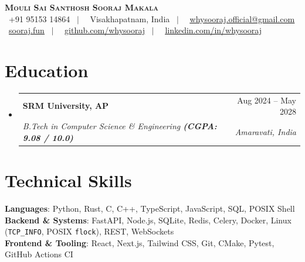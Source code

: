 \documentclass[letterpaper,11pt]{article}
\makeatletter
\newcommand{\resumeSubheading}[4]{
  \vspace{-2pt}\item
    \begin{tabular*}{0.97\textwidth}[t]{l@{\extracolsep{\fill}}r}
      \textbf{#1} & #2 \\
      \textit{\small#3} & \textit{\small #4} \\
    \end{tabular*}\vspace{-7pt}
}
\newcommand{\resumeSubHeadingListStart}{\begin{itemize}[leftmargin=0.15in, label={}]}
\newcommand{\resumeSubHeadingListEnd}{\end{itemize}}
\makeatother
\begin{document}
\begin{center}
    \textbf{\Huge \scshape Mouli Sai Santhosh Sooraj Makala} \\ \vspace{4pt}
    \small \faPhone* \ +91 95153 14864 \ $|$ \
    \faMapMarker* \ Visakhapatnam, India \ $|$ \
    \faEnvelope \ \href{mailto:whysooraj.official@gmail.com}{\underline{whysooraj.official@gmail.com}} \\ \vspace{2pt}
    \faGlobe \ \href{https://sooraj.fun}{\underline{sooraj.fun}} \ $|$ \
    \faGithub \ \href{https://github.com/whysooraj}{\underline{github.com/whysooraj}} \ $|$ \
    \faLinkedin \ \href{https://linkedin.com/in/whysooraj}{\underline{linkedin.com/in/whysooraj}}
\end{center}

\section{Education}
  \resumeSubHeadingListStart
    \resumeSubheading
      {SRM University, AP}{Aug 2024 -- May 2028}
      {B.Tech in Computer Science \& Engineering \textbf{(CGPA: 9.08 / 10.0)}}{Amaravati, India}
  \resumeSubHeadingListEnd

\section{Technical Skills}
 \begin{itemize}[leftmargin=0.15in, label={}]
    \small{\item{
     \textbf{Languages}{: Python, Rust, C, C++, TypeScript, JavaScript, SQL, POSIX Shell} \\
     \textbf{Backend \& Systems}{: FastAPI, Node.js, SQLite, Redis, Celery, Docker, Linux (\texttt{TCP\_INFO}, POSIX \texttt{flock}), REST, WebSockets} \\
     \textbf{Frontend \& Tooling}{: React, Next.js, Tailwind CSS, Git, CMake, Pytest, GitHub Actions CI}
    }}
 \end{itemize}

\end{document}
